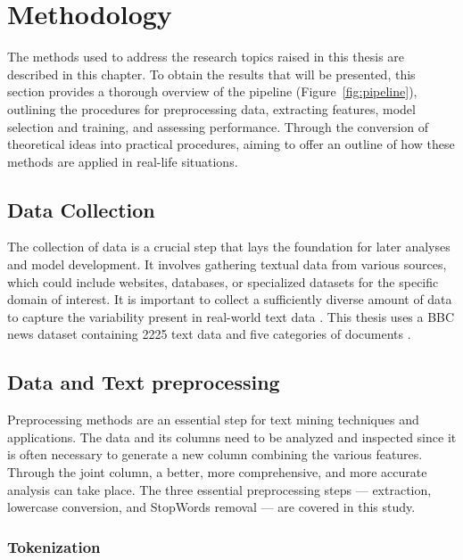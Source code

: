 \chapter{Methodology}

The methods used to address the research topics raised in this thesis are described in this chapter. To obtain the results that will be presented, this section provides a thorough overview of the pipeline (Figure~\ref{fig:pipeline}), outlining the procedures for preprocessing data, extracting features, model selection and training, and assessing performance. Through the conversion of theoretical ideas into practical procedures, aiming to offer an outline of how these methods are applied in real-life situations.


\section{Data Collection}

The collection of data is a crucial step that lays the foundation for later analyses and model development. It involves gathering textual data from various sources, which could include websites, databases, or specialized datasets for the specific domain of interest. It is important to collect a sufficiently diverse amount of data to capture the variability present in real-world text data \citep{openai_gpt3}. This thesis uses a BBC news dataset containing 2225 text data and five categories of documents \citep{text_dataset}. 

\section{Data and Text preprocessing}

Preprocessing methods are an essential step for text mining techniques and applications. The data and its columns need to be analyzed and inspected since it is often necessary to generate a new column combining the various features. Through the joint column, a better, more comprehensive, and more accurate analysis can take place. The three essential preprocessing steps — extraction, lowercase conversion, and StopWords removal — are covered in this study.

\subsection{Tokenization}

